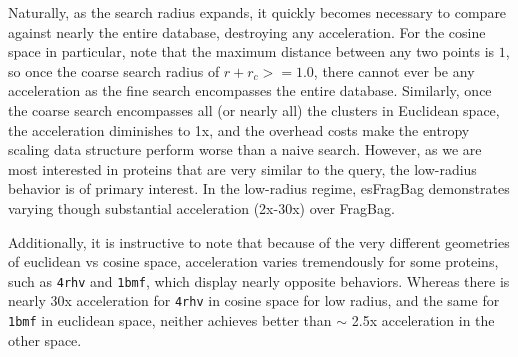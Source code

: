\documentclass[review,preprint,12pt]{elsarticle}
\theoremstyle{definition}
\theoremstyle{remark}
\numberwithin{equation}{section}
\begin{document}
Naturally, as the search radius expands, it quickly becomes necessary to compare against nearly the entire database, destroying any acceleration.
For the cosine space in particular, note that the maximum distance between any two points is $1$, so once the coarse search radius of $r+r_c >= 1.0$, there cannot ever be any acceleration as the fine search encompasses the entire database.
Similarly, once the coarse search encompasses all (or nearly all) the clusters in Euclidean space, the acceleration diminishes to 1x, and the overhead costs make the entropy scaling data structure perform worse than a naive search.
However, as we are most interested in proteins that are very similar to the query, the low-radius behavior is of primary interest.
In the low-radius regime, esFragBag demonstrates varying though substantial acceleration (2x-30x) over FragBag.

Additionally, it is instructive to note that because of the very different geometries of euclidean vs cosine space, acceleration varies tremendously for some proteins, such as \texttt{4rhv} and \texttt{1bmf}, which display nearly opposite behaviors.
Whereas there is nearly 30x acceleration for \texttt{4rhv} in cosine space for low radius, and the same for \texttt{1bmf} in euclidean space, neither achieves better than $\sim$ 2.5x acceleration in the other space.
\end{document}
